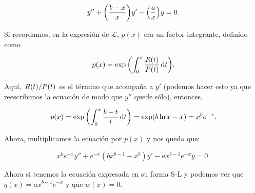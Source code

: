 \documentclass[11pt]{article}
\begin{document}
\begin{equation}
    y'' + \pqty{\frac{b-x}{x}}y' - \pqty{\frac{a}{x}}y = 0.
\end{equation}

Si recordamos, en la expresión de $\mathcal{L}$, $p(x)$ era un factor integrante, definido como

\begin{equation}
    p(x) = \exp\pqty{\int_0^x \frac{R(t)}{P(t)}\dd{t}}.
\end{equation}

Aquí, $\flatfrac{R(t)}{P(t)}$ es el término que acompaña a $y'$ (podemos hacer esto ya que reescribimos la ecuación de modo que $y''$ quede sólo), entonces,

\begin{equation}
    p(x) = \exp\pqty{\int_0^x \frac{b-t}{t}\dd{t}} = \exp(b\ln x-x) = x^be^{-x}.
\end{equation}

Ahora, multiplicamos la ecuación por $p(x)$ y nos queda que:

\begin{equation}
    x^be^{-x}y'' + e^{-x}(bx^{b-1}-x^{b})y' - ax^{b-1}e^{-x}y = 0.
\end{equation}

Ahora si tenemos la ecuación expresada en su forma S-L y podemos ver que $q(x) = ax^{b-1}e^{-x}$ y que $w(x) = 0$.
\end{document}
